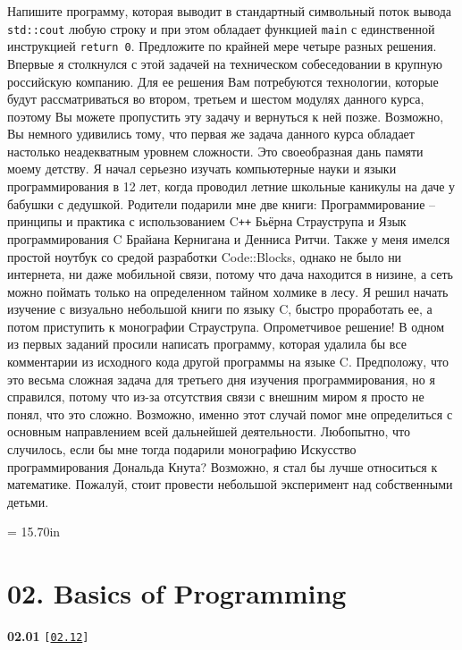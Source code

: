 \documentclass[a4paper,12pt]{article}
\begin{document}
Напишите программу, которая выводит в стандартный символьный поток вывода \lstinline{std::cout} любую строку и при этом обладает функцией \lstinline{main} с единственной инструкцией \lstinline{return 0}. Предложите по крайней мере четыре разных решения. Впервые я столкнулся с этой задачей на техническом собеседовании в крупную российскую компанию. Для ее решения Вам потребуются технологии, которые будут рассматриваться во втором, третьем и шестом модулях данного курса, поэтому Вы можете пропустить эту задачу и вернуться к ней позже. Возможно, Вы немного удивились тому, что первая же задача данного курса обладает настолько неадекватным уровнем сложности. Это своеобразная дань памяти моему детству. Я начал серьезно изучать компьютерные науки и языки программирования в 12 лет, когда проводил летние школьные каникулы на даче у бабушки с дедушкой. Родители подарили мне две книги: Программирование -- принципы и практика с использованием C\texttt{++} Бьёрна Страуструпа и Язык программирования C Брайана Кернигана и Денниса Ритчи. Также у меня имелся простой ноутбук со средой разработки Code::Blocks, однако не было ни интернета, ни даже мобильной связи, потому что дача находится в низине, а сеть можно поймать только на определенном тайном холмике в лесу. Я решил начать изучение с визуально небольшой книги по языку C, быстро проработать ее, а потом приступить к монографии Страуструпа. Опрометчивое решение! В одном из первых заданий просили написать программу, которая удалила бы все комментарии из исходного кода другой программы на языке C. Предположу, что это весьма сложная задача для третьего дня изучения программирования, но я справился, потому что из-за отсутствия связи с внешним миром я просто не понял, что это сложно. Возможно, именно этот случай помог мне определиться с основным направлением всей дальнейшей деятельности. Любопытно, что случилось, если бы мне тогда подарили монографию Искусство программирования Дональда Кнута? Возможно, я стал бы лучше относиться к математике. Пожалуй, стоит провести небольшой эксперимент над собственными детьми.



\newpage\thispagestyle{empty}\pdfpageheight = 15.70in\enlargethispage{100in}

\section{02. Basics of Programming}

{\large \textbf{02.01} \texttt{[\href{https://github.com/i-s-m-mipt/Education/blob/master/projects/examples/source/02.12.cpp}{\texttt{02.12}}]}}
\end{document}
